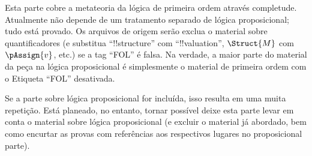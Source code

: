 \documentclass[../../include/open-logic-part]{subfiles}
\begin{document}

\begin{editorial}Esta parte cobre a metateoria da lógica de primeira ordem através
  completude.  Atualmente não depende de um tratamento separado de
  lógica proposicional; tudo está provado.  Os arquivos de origem serão
  exclua o material sobre quantificadores (e substitua ``!!{structure}''
  com ``!!{valuation}'', $\Struct{M}$ com $\pAssign{v}$, etc.) se
  a tag ``FOL'' é falsa. Na verdade, a maior parte do material da peça
  na lógica proposicional é simplesmente o material de primeira ordem com o
  Etiqueta ``FOL'' desativada.

Se a parte sobre lógica proposicional for incluída, isso resulta em uma
  muita repetição. Está planeado, no entanto, tornar possível
  deixe esta parte levar em conta o material sobre lógica proposicional
  (e excluir o material já abordado, bem como encurtar as provas
  com referências aos respectivos lugares no proposicional
  parte).\end{editorial}












\OLEndPartHook
\end{document}
